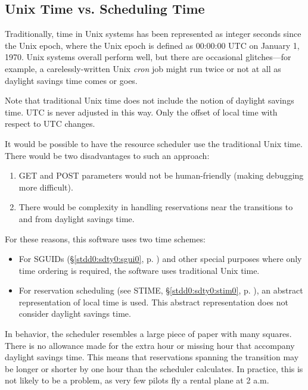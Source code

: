 \documentclass[letterpaper,10pt,titlepage]{article}
\begin{document}

\subsection{Unix Time vs. Scheduling Time}
\label{stbg0:sutv0}

Traditionally, time in Unix systems has been represented as integer seconds since
the Unix epoch, where the Unix epoch is defined as
00:00:00 UTC on January 1, 1970.  Unix systems overall perform well,
but there are occasional glitches---for example, a carelessly-written Unix
\emph{cron} job might run twice or not at all as daylight
savings time comes or goes.

Note that traditional Unix time does not include the notion of daylight savings time.
UTC is never adjusted in this way.  Only the offset of local time
with respect to UTC changes.

It would be possible to have the resource scheduler use the traditional
Unix time.  There would be two disadvantages to such an approach:

\begin{enumerate}
\item GET and POST parameters would not be human-friendly (making debugging
      more difficult).
\item There would be complexity in handling reservations near the transitions
      to and from daylight savings time.
\end{enumerate}

For these reasons, this software uses two time schemes:

\begin{itemize}
\item For SGUIDs 
      (\S{}\ref{stdd0:sdty0:sgui0}, p. \pageref{stdd0:sdty0:sgui0})
      and other special purposes where only time ordering is required, the software uses
      traditional Unix time.
\item For reservation scheduling 
      (see STIME, \S{}\ref{stdd0:sdty0:stim0}, p. \pageref{stdd0:sdty0:stim0}),
      an abstract representation of local time is used.  This abstract 
      representation does not consider daylight savings time.
\end{itemize}

In behavior, the scheduler resembles a large piece of paper with many
squares.  There is no allowance made for the extra hour or missing hour
that accompany daylight savings time.  This means that reservations
spanning the transition may be longer or shorter by one hour than the 
scheduler calculates.  In practice, this is not likely to be a problem, as
very few pilots fly a rental plane at 2 a.m.
\end{document}
